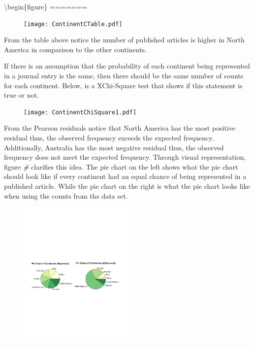 \documentclass[
]{article}
\begin{document}
\textbackslash begin\{figure\} \centering =======

\begin{figure}
    \centering
    \texttt{[image: ContinentCTable.pdf]}
    \label{fig:Contingency Table}
\end{figure}

From the table above notice the number of published articles is higher
in North America in comparison to the other continents.

If there is an assumption that the probability of each continent being
represented in a journal entry is the same, then there should be the
same number of counts for each continent. Below, is a XChi-Square test
that shows if this statement is true or not.

\begin{figure}
    \centering
    \texttt{[image: ContinentChiSquare1.pdf]}
    \label{fig:Continent XChi-Square}
\end{figure}

From the Pearson residuals notice that North America has the most
positive residual thus, the observed frequency exceeds the expected
frequency. Additionally, Australia has the most negative residual thus,
the observed frequency does not meet the expected frequency. Through
visual representation, figure \emph{\#} clarifies this idea. The pie
chart on the left shows what the pie chart should look like if every
continent had an equal chance of being represented in a published
article. While the pie chart on the right is what the pie chart looks
like when using the counts from the data set.

\begin{figure}
    \centering
    \includegraphics[width=0.50\textwidth]{ContinentPieChart.pdf}
    \label{fig:Continent Pie Chart}
\end{figure}
\end{document}
